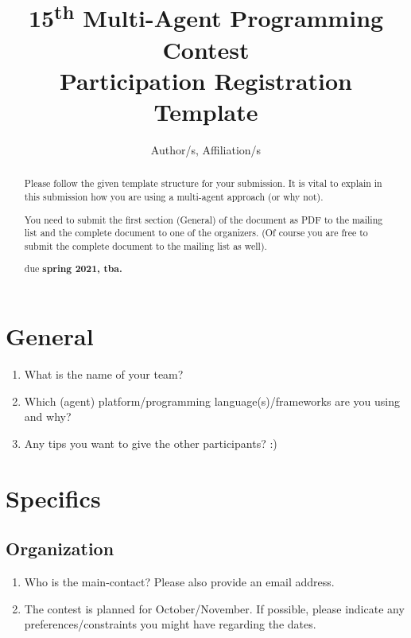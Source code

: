 \documentclass{article}
\begin{document}
\title{15\textsuperscript{th} Multi-Agent Programming Contest\\Participation Registration Template}
\author{Author/s, Affiliation/s}
\maketitle

\begin{abstract}
  Please follow the given template structure for your submission. It is vital to explain in this submission how you are using a multi-agent approach (or why not).

  You need to submit the first section (General) of the document as PDF to the mailing list and the complete document to one of the organizers. (Of course you are free to submit the complete document to the mailing list as well).

  \begin{center}
    due \textbf{spring 2021, tba.}
  \end{center}
\end{abstract}


\section*{General}

\begin{enumerate}
  \item What is the name of your team?
  \item Which (agent) platform/programming language(s)/frameworks are you using and why?
  \item Any tips you want to give the other participants? :)
\end{enumerate}

\section*{Specifics}

\subsection*{Organization}

\begin{enumerate}
  \item Who is the main-contact? Please also provide an email address.
  \item The contest is planned for October/November. If possible, please indicate any preferences/constraints you might have regarding the dates.
\end{enumerate}
\end{document}
